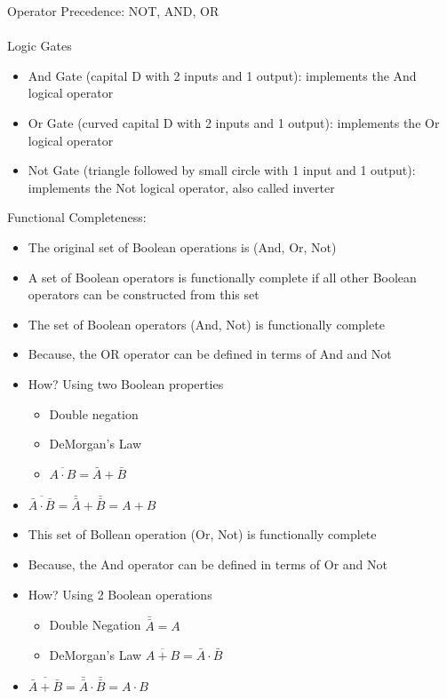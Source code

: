 \documentclass[12pt]{article}
\begin{document}
Operator Precedence: NOT, AND, OR \\~\\ 

Logic Gates \begin{itemize} 
\item And Gate (capital D with 2 inputs and 1 output): implements the And logical operator 
\item Or Gate (curved capital D with 2 inputs and 1 output): implements the Or logical operator 
\item Not Gate (triangle followed by small circle with 1 input and 1 output): implements the Not logical operator, also called inverter 


 \end{itemize} 

Functional Completeness: \begin{itemize} 
\item The original set of Boolean operations is (And, Or, Not) 
\item A set of Boolean operators is functionally complete if all other Boolean operators can be constructed from this set 
 \item The set of Boolean operators (And, Not) is functionally complete
 \item Because, the OR operator can be defined in terms of And and Not
 \item How? Using two Boolean properties \begin{itemize} 
  \item Double negation \item DeMorgan's Law 
  \item $\overline{A \cdot B} = \bar{A} + \bar{B} $ \end{itemize}
  \item $\overline{\bar{A} \cdot \bar{B}} = \bar{\bar{A}} + \bar{\bar{B}} = A + B $ 
  \item This set of Bollean operation (Or, Not) is functionally complete 
  \item Because, the And operator can be defined in terms of Or and Not 
  \item How? Using 2 Boolean operations \begin{itemize} 
  \item Double Negation $\bar{\bar{A}} = A $ 
  \item DeMorgan's Law $\overline{A + B} = \bar{A} \cdot \bar{B} $ \end{itemize} 
  \item $ \overline{\bar{A} + \bar{B}} = \bar{\bar{A}} \cdot \bar{\bar{B}} = A \cdot B $ \end{itemize}
\end{document}
